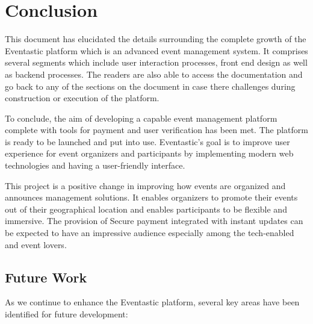 \chapter{Conclusion}
\label{ch:sum}

This document has elucidated the details surrounding the complete growth of the Eventastic platform which is an advanced event management system. It comprises several segments which include user interaction processes, front end design as well as backend processes. The readers are also able to access the documentation and go back to any of the sections on the document in case there challenges during construction or execution of the platform.

To conclude, the aim of developing a capable event management platform complete with tools for payment and user verification has been met. The platform is ready to be launched and put into use. Eventastic's goal is to improve user experience for event organizers and participants by implementing modern web technologies and having a user-friendly interface.

This project is a positive change in improving how events are organized and announces management solutions. It enables organizers to promote their events out of their geographical location and enables participants to be flexible and immersive. The provision of Secure payment integrated with instant updates can be expected to have an impressive audience especially among the tech-enabled and event lovers.



\section{Future Work}

As we continue to enhance the Eventastic platform, several key areas have been identified for future development:

